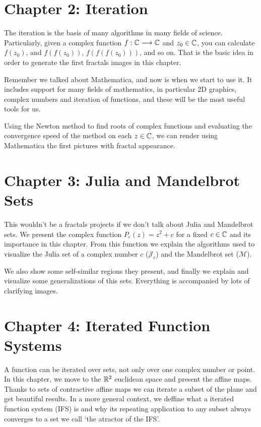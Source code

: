 \section*{Chapter 2: Iteration}

The iteration is the basis of many algorithms in many fields of science. Particularly, given a complex function $f:\mathbb{C}\longrightarrow\mathbb{C}$ and $z_0\in\mathbb{C}$, you can calculate $f(z_0)$, and $f(f(z_0))$, $f(f(f(z_0)))$, and so on. That is the basic idea in order to generate the first fractals images in this chapter.

Remember we talked about Mathematica, and now is when we start to use it. It includes support for many fields of mathematics, in particular 2D graphics, complex numbers and iteration of functions, and these will be the most useful tools for us. 

Using the Newton method to find roots of complex functions and evaluating the convergence speed of the method on each $z\in\mathbb{C}$, we can render using Mathematica the first pictures with fractal appearance.

\section*{Chapter 3: Julia and Mandelbrot Sets}

This wouldn't be a fractals projects if we don't talk about Julia and Mandelbrot sets. We present the complex function $P_c(z)=z^2 +c$ for a fixed $c\in\mathbb{C}$ and its importance in this chapter. From this function we explain the algorithms used to visualize the Julia set of a complex number $c$ ($\mathcal{J}_c$) and the Mandelbrot set ($\mathcal{M}$). 

We also show some self-similar regions they present, and finally we explain and visualize some generalizations of this sets. Everything is accompanied by lots of clarifying images.

\section*{Chapter 4: Iterated Function Systems}

A function can be iterated over sets, not only over one complex number or point. In this chapter, we move to the $\mathbb{R}^2$ euclidean space and present the affine maps. Thanks to sets of contractive affine maps we can iterate a subset of the plane and get beautiful results. In a more general context, we deffine what a iterated function system (IFS) is and why its repeating application to any subset always converges to a set we call `the atractor of the IFS'.

